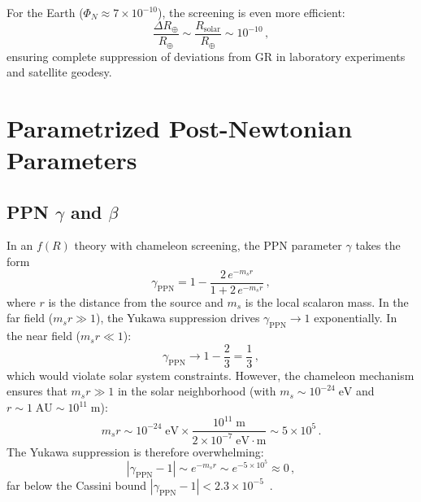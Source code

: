 \documentclass[amsmath,amssymb,aps,prd,twocolumn,superscriptaddress,nofootinbib]{revtex4-2}
\begin{document}
For the Earth ($\Phi_N \approx 7 \times 10^{-10}$), the screening
is even more efficient:
\begin{equation}
  \frac{\Delta R_\oplus}{R_\oplus}
    \sim \frac{R_{\mathrm{solar}}}{R_\oplus}
    \sim 10^{-10}\,,
  \label{eq:thin_shell_earth}
\end{equation}
ensuring complete suppression of deviations from GR in laboratory
experiments and satellite geodesy.

\section{Parametrized Post-Newtonian Parameters}
\label{sec:PPN}

\subsection{PPN $\gamma$ and $\beta$}

In an $f(R)$ theory with chameleon screening, the PPN parameter
$\gamma$ takes the form~\cite{Chiba2007,Olmo2005}
\begin{equation}
  \gamma_{\mathrm{PPN}} = 1
    - \frac{2\,e^{-m_s r}}{1 + 2\,e^{-m_s r}}\,,
  \label{eq:gamma_PPN}
\end{equation}
where $r$ is the distance from the source and $m_s$ is the local
scalaron mass.  In the far field ($m_s r \gg 1$), the Yukawa
suppression drives $\gamma_{\mathrm{PPN}} \to 1$ exponentially.
In the near field ($m_s r \ll 1$):
\begin{equation}
  \gamma_{\mathrm{PPN}} \to 1 - \frac{2}{3} = \frac{1}{3}\,,
  \label{eq:gamma_near}
\end{equation}
which would violate solar system constraints.  However, the
chameleon mechanism ensures that $m_s r \gg 1$ in the solar
neighborhood (with $m_s \sim 10^{-24}\;\mathrm{eV}$ and
$r \sim 1\;\mathrm{AU} \sim 10^{11}\;\mathrm{m}$):
\begin{equation}
  m_s r \sim 10^{-24}\;\mathrm{eV}
         \times \frac{10^{11}\;\mathrm{m}}
                     {2 \times 10^{-7}\;\mathrm{eV\cdot m}}
       \sim 5 \times 10^{5}\,.
  \label{eq:msr_solar}
\end{equation}
The Yukawa suppression is therefore overwhelming:
\begin{equation}
  |\gamma_{\mathrm{PPN}} - 1|
    \sim e^{-m_s r}
    \sim e^{-5 \times 10^{5}}
    \approx 0\,,
  \label{eq:gamma_deviation}
\end{equation}
far below the Cassini bound $|\gamma_{\mathrm{PPN}} - 1| <
2.3 \times 10^{-5}$~\cite{Bertotti2003}.
\end{document}
